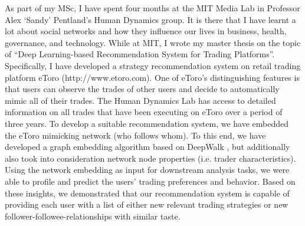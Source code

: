 As part of my MSc, I have spent four months at the MIT Media Lab in Professor Alex `Sandy' Pentland's Human Dynamics group. 
It is there that I have learnt a lot about social networks and how they influence our lives in business, health, governance, and technology.
While at MIT, I wrote my master thesis on the topic of ``Deep Learning-based Recommendation System for Trading Platforms''. 
Specifically, I have developed a strategy recommendation system on retail trading platform eToro (http://www.etoro.com).
One of eToro's distinguishing features is that users can observe the trades of other users and decide to automatically mimic all of their trades.
The Human Dynamics Lab has access to detailed information on all trades that have been executing on eToro over a period of three years. 
To develop a suitable recommendation system, we have embedded the eToro mimicking network (who follows whom). 
To this end, we have developed a graph embedding algorithm based on DeepWalk \cite{perozzi2014deepwalk}, but additionally also took into consideration network node properties (i.e. trader characteristics). 
Using the network embedding as input for downstream analysis tasks, we were able to profile and predict the users' trading preferences and behavior. 
Based on these insights, we demonstrated that our recommendation system is capable of providing each user with a list of either new relevant trading strategies or new follower-followee-relationships with similar taste.\\

